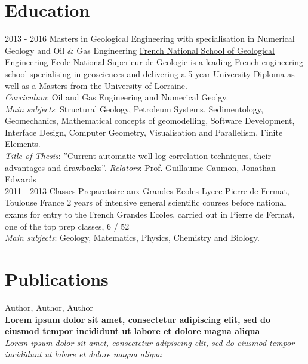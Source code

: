 \documentclass[]{friggeri-cv}
\begin{document}
\section{Education}
\begin{entrylist}
  \entry
    {2013 - 2016}
    {Masters in Geological Engineering with specialisation in Numerical Geology and Oil \& Gas Engineering}
    {\href{http://ensg.univ-lorraine.fr/english/}{French National School of Geological Engineering}}
    {Ecole National Superieur de Geologie is a leading French engineering school specialising in geosciences and delivering a 5 year University Diploma as well as a Masters from the University of Lorraine.\\ \emph{Curriculum}: Oil and Gas Engineering and Numerical Geolgy.\\ 
    \emph{Main subjects}: Structural Geology, Petroleum Systems, Sedimentology, Geomechanics, Mathematical concepts of geomodelling, Software Development, Interface Design, Computer Geometry, Visualisation and Parallelism, Finite Elements.\\
    \emph{Title of Thesis}: ”Current automatic well log correlation techniques, their advantages and drawbacks”.
    \emph{Relators}: Prof. Guillaume Caumon, Jonathan Edwards\\}
  \entry
    {2011 - 2013}
    {\href{https://en.wikipedia.org/wiki/Classe_preparatoire_aux_grandes_ecoles}{Classes Preparatoire aux Grandes Ecoles}}
    {Lycee Pierre de Fermat, Toulouse France}
    {2 years of intensive general scientific courses before national exams for entry to the French Grandes Ecoles, carried out in Pierre de Fermat, one of the top prep classes, 6 / 52\\ 
    \emph{Main subjects}: Geology, Matematics, Physics, Chemistry and Biology.\\}
\end{entrylist}

\newpage

\section{Publications}
Author, Author, Author\\
\textbf{Lorem ipsum dolor sit amet, consectetur adipiscing elit, sed do eiusmod tempor incididunt ut labore et dolore magna aliqua}\\
\emph{Lorem ipsum dolor sit amet, consectetur adipiscing elit, sed do eiusmod tempor incididunt ut labore et dolore magna aliqua}
\\
\end{document}
